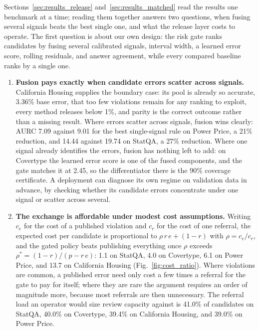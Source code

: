 \documentclass[preprint,12pt,authoryear]{elsarticle}
\begin{document}
Sections~\ref{sec:results_release} and~\ref{sec:results_matched} read the results one benchmark at a time; reading them together answers two questions, when fusing several signals beats the best single one, and what the release layer costs to operate.
The first question is about our own design: the risk gate ranks candidates by fusing several calibrated signals, interval width, a learned error score, rolling residuals, and answer agreement, while every compared baseline ranks by a single one.

\begin{enumerate}
    \renewcommand{\labelenumi}{\arabic{enumi}.}
    \setlength{\itemsep}{5pt}

    \item \textbf{Fusion pays exactly when candidate errors scatter across signals.}
    California Housing supplies the boundary case: its pool is already so accurate, 3.36\% base error, that too few violations remain for any ranking to exploit, every method releases below 1\%, and parity is the correct outcome rather than a missing result.
    Where errors scatter across signals, fusion wins clearly: AURC 7.09 against 9.01 for the best single-signal rule on Power Price, a 21\% reduction, and 14.44 against 19.74 on StatQA, a 27\% reduction.
    Where one signal already identifies the errors, fusion has nothing left to add: on Covertype the learned error score is one of the fused components, and the gate matches it at 2.45, so the differentiator there is the 90\% coverage certificate.
    A deployment can diagnose its own regime on validation data in advance, by checking whether its candidate errors concentrate under one signal or scatter across several.

    \item \textbf{The exchange is affordable under modest cost assumptions.}
    Writing $c_e$ for the cost of a published violation and $c_r$ for the cost of one referral, the expected cost per candidate is proportional to $\rho\,r\,e+(1-r)$ with $\rho=c_e/c_r$, and the gated policy beats publishing everything once $\rho$ exceeds $\rho^{\ast}=(1-r)/(p-r\,e)$: 1.1 on StatQA, 4.0 on Covertype, 6.1 on Power Price, and 13.7 on California Housing (Fig.~\ref{fig:cost_ratio}).
    Where violations are common, a published error need only cost a few times a referral for the gate to pay for itself; where they are rare the argument requires an order of magnitude more, because most referrals are then unnecessary.
    The referral load an operator would size review capacity against is 41.0\% of candidates on StatQA, 40.0\% on Covertype, 39.4\% on California Housing, and 39.0\% on Power Price.
\end{enumerate}
\end{document}
